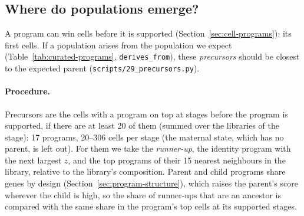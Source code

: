 \documentclass[11pt,a4paper]{article}
\begin{document}
\subsection{Where do populations emerge?}
\label{sec:precursors}

A program can win cells before it is supported (Section~\ref{sec:cell-programs}): its first cells. If a population arises from the population we expect (Table~\ref{tab:curated-programs}, \texttt{derives\_from}), these \emph{precursors} should be closest to the expected parent (\nolinkurl{scripts/29_precursors.py}).

\paragraph{Procedure.} Precursors are the cells with a program on top at stages before the program is supported, if there are at least 20 of them (summed over the libraries of the stage): 17 programs, 20--306 cells per stage (the maternal state, which has no parent, is left out). For them we take the \emph{runner-up}, the identity program with the next largest $z$, and the top programs of their 15 nearest neighbours in the library, relative to the library's composition. Parent and child programs share genes by design (Section~\ref{sec:program-structure}), which raises the parent's score wherever the child is high, so the share of runner-ups that are an ancestor is compared with the same share in the program's top cells at its supported stages.
\end{document}
